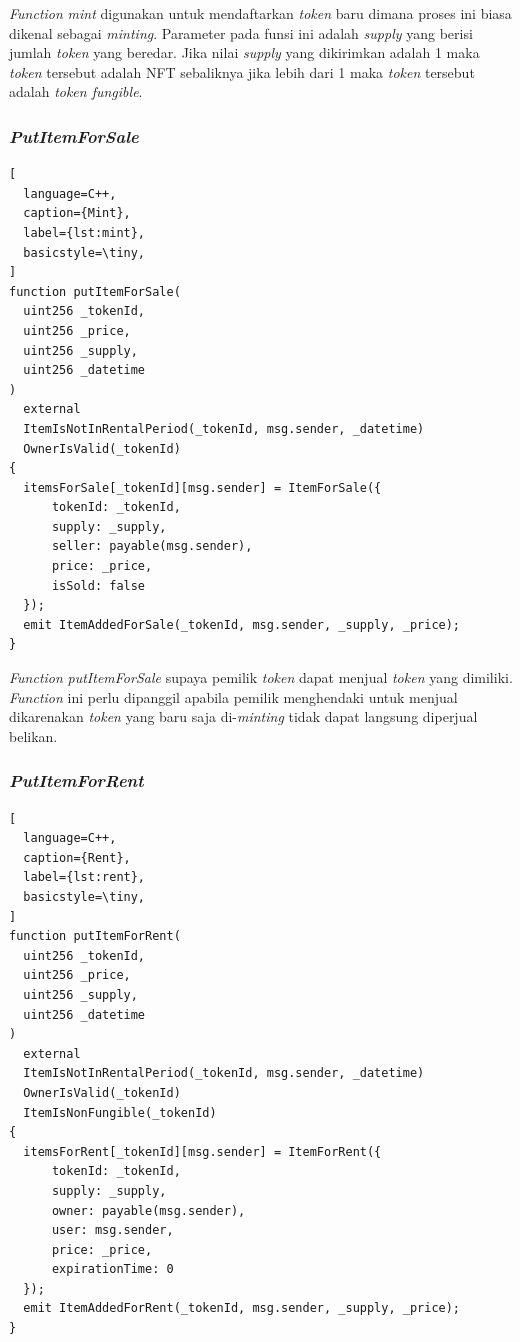 \emph{Function} \emph{mint} digunakan untuk mendaftarkan \emph{token} baru dimana proses ini biasa dikenal sebagai \emph{minting}. Parameter pada funsi ini adalah \emph{supply} yang berisi jumlah \emph{token} yang beredar. Jika nilai \emph{supply} yang dikirimkan adalah 1 maka \emph{token} tersebut adalah NFT sebaliknya jika lebih dari 1 maka \emph{token} tersebut adalah \emph{token fungible}.

\subsubsection{\emph{PutItemForSale}}

\begin{lstlisting}[
  language=C++,
  caption={Mint},
  label={lst:mint},
  basicstyle=\tiny,
]
function putItemForSale(
  uint256 _tokenId,
  uint256 _price,
  uint256 _supply,
  uint256 _datetime
)
  external
  ItemIsNotInRentalPeriod(_tokenId, msg.sender, _datetime)
  OwnerIsValid(_tokenId)
{
  itemsForSale[_tokenId][msg.sender] = ItemForSale({
      tokenId: _tokenId,
      supply: _supply,
      seller: payable(msg.sender),
      price: _price,
      isSold: false
  });
  emit ItemAddedForSale(_tokenId, msg.sender, _supply, _price);
}
\end{lstlisting}

\emph{Function} \emph{putItemForSale} supaya pemilik \emph{token} dapat menjual \emph{token} yang dimiliki. \emph{Function} ini perlu dipanggil apabila pemilik menghendaki untuk menjual dikarenakan \emph{token} yang baru saja di-\emph{minting} tidak dapat langsung diperjual belikan.

\subsubsection{\emph{PutItemForRent}}

\begin{lstlisting}[
  language=C++,
  caption={Rent},
  label={lst:rent},
  basicstyle=\tiny,
]
function putItemForRent(
  uint256 _tokenId,
  uint256 _price,
  uint256 _supply,
  uint256 _datetime
)
  external
  ItemIsNotInRentalPeriod(_tokenId, msg.sender, _datetime)
  OwnerIsValid(_tokenId)
  ItemIsNonFungible(_tokenId)
{
  itemsForRent[_tokenId][msg.sender] = ItemForRent({
      tokenId: _tokenId,
      supply: _supply,
      owner: payable(msg.sender),
      user: msg.sender,
      price: _price,
      expirationTime: 0
  });
  emit ItemAddedForRent(_tokenId, msg.sender, _supply, _price);
}
\end{lstlisting}


